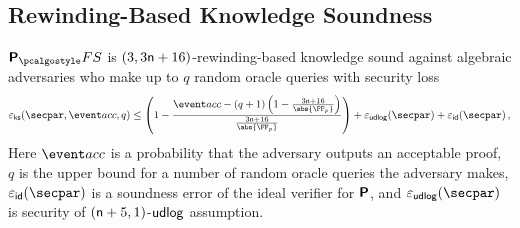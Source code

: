 \subsection{Rewinding-Based Knowledge Soundness}
\begin{lemma}
	\label{lem:plonkprot_ss}
  $\plonkprotfs$ is $(3, 3 \mathsf{n} + 16)$-rewinding-based knowledge sound against algebraic adversaries who make up to $q$ random oracle queries with security loss 
  \[
    \epscss(\secpar,\accProb, q) \leq \left(1 - \frac{\accProb - (q + 1) \left(1 - \frac{3 \noofc + 16}{\abs{\FF_p}} \right)}{\frac{3 \noofc + 16}{\abs{\FF_p}}}\right) + \epsudlog (\secpar) + \epsid (\secpar)\,,
  \]
	Here $\accProb$ is a probability that the adversary outputs an acceptable proof, $q$ is the upper bound for a number of random oracle queries the adversary makes, $\epsid(\secpar)$ is a soundness error of the ideal verifier for $\bm{\mathsf{P}}$, and $\epsudlog(\secpar)$ is security of $(\mathsf{n} + 5, 1)$-$\mathsf{udlog}$ 
	assumption.
\end{lemma}


